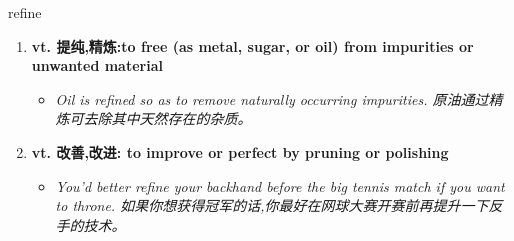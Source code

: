 
\begin{frame}
{\huge refine}
\begin{center}
\begin{enumerate}\Large
  \item \textbf{vt. 提纯,精炼:to free (as metal, sugar, or oil) from impurities or unwanted material}
  \begin{itemize}
    \item \em{\Large{Oil is refined so as to remove naturally occurring impurities. 原油通过精炼可去除其中天然存在的杂质。}}
  \end{itemize}
  \item \textbf{vt. 改善,改进: to improve or perfect by pruning or polishing}
  \begin{itemize}
    \item \em{\Large{You’d better refine your backhand before the big tennis match if you want to throne. 如果你想获得冠军的话,你最好在网球大赛开赛前再提升一下反手的技术。}}
  \end{itemize}
\end{enumerate}
\end{center}
\end{frame}
